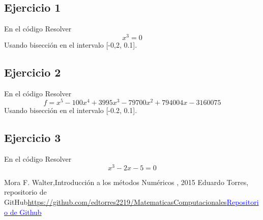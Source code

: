 \documentclass{article}
\begin{document}
\subsection{Ejercicio 1}
En el código Resolver 
\begin{equation}
    x^{3}= 0
\end{equation}
Usando bisección en el intervalo [-0,2, 0.1].

\subsection{Ejercicio 2}
En el código Resolver 
\begin{equation}
    f= x^{5}-100x^{4}+3995x^{3}-79700x^{2}+794004x-3160075
\end{equation}
Usando bisección en el intervalo [-0.2, 0.1].

\subsection{Ejercicio 3}
En el código Resolver 
\begin{equation}
    x^{3}-2x-5=0
\end{equation}

\begin{thebibliography}{0}
   Mora F. Walter,Introducción a los métodos Numéricos , 2015
  Eduardo Torres, repositorio de GitHub\textcolor{blue}{\url{https://github.com/edtorres2219/MatematicasComputacionales}}\href{https://github.com/edtorres2219/MatematicasComputacionales}{\textcolor{blue}{Repositorio de Github}}
\end{thebibliography}
\end{document}
